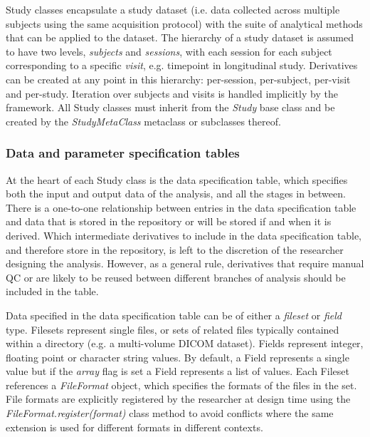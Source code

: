 \documentclass[smallextended]{svjour3}       %
\begin{document}
Study classes encapsulate a study dataset (i.e. data collected across
multiple subjects using the same acquisition protocol) with the suite of
analytical methods that can be applied to the dataset. The hierarchy of
a study dataset is assumed to have two levels, \emph{subjects} and
\emph{sessions}, with each session for each subject corresponding to a
specific \emph{visit}, e.g. timepoint in longitudinal study. Derivatives
can be created at any point in this hierarchy: per-session, per-subject,
per-visit and per-study. Iteration over subjects and visits is handled
implicitly by the framework. All Study classes must inherit from the
\emph{Study} base class and be created by the \emph{StudyMetaClass}
metaclass or subclasses thereof.

\subsubsection*{Data and parameter specification
tables}
\label{sec:data-and-parameter-specification-tables}

At the heart of each Study class is the data specification table, which
specifies both the input and output data of the analysis, and all the
stages in between. There is a one-to-one relationship between entries in
the data specification table and data that is stored in the repository
or will be stored if and when it is derived. Which intermediate
derivatives to include in the data specification table, and therefore
store in the repository, is left to the discretion of the researcher
designing the analysis. However, as a general rule, derivatives that
require manual QC or are likely to be reused between different branches
of analysis should be included in the table.

Data specified in the data specification table can be of either a
\emph{fileset} or \emph{field} type. Filesets represent single files,
or sets of related files typically contained within a directory
(e.g. a multi-volume DICOM dataset). Fields
represent integer, floating point or character string
values. By default, a Field represents a single value but if the \emph{array}
flag is set a Field represents a list of values.
Each Fileset references a \emph{FileFormat} object, which
specifies the formats of the files in the set. File formats are
explicitly registered by the researcher at design time using the
\emph{FileFormat.register(format)} class method to avoid conflicts where
the same extension is used for different formats in different contexts.
\end{document}
